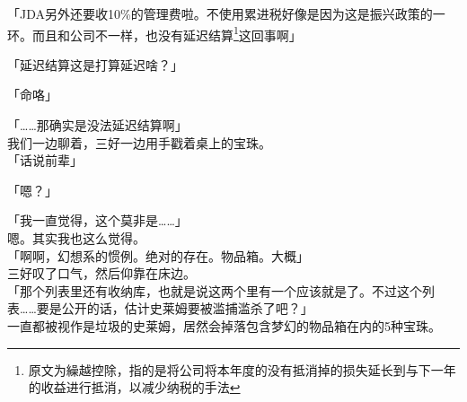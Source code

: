 「JDA另外还要收10\%的管理费啦。不使用累进税好像是因为这是振兴政策的一环。而且和公司不一样，也没有延迟结算\footnote{原文为繰越控除，指的是将公司将本年度的没有抵消掉的损失延长到与下一年的收益进行抵消，以减少纳税的手法}这回事啊」

「延迟结算这是打算延迟啥？」

「命咯」

「……那确实是没法延迟结算啊」\\

我们一边聊着，三好一边用手戳着桌上的宝珠。\\

「话说前辈」

「嗯？」

「我一直觉得，这个莫非是……」\\

嗯。其实我也这么觉得。\\

「啊啊，幻想系的惯例。绝对的存在。物品箱。大概」\\

三好叹了口气，然后仰靠在床边。\\

「那个列表里还有收纳库，也就是说这两个里有一个应该就是了。不过这个列表……要是公开的话，估计史莱姆要被滥捕滥杀了吧？」\\

一直都被视作是垃圾的史莱姆，居然会掉落包含梦幻的物品箱在内的5种宝珠。\\

